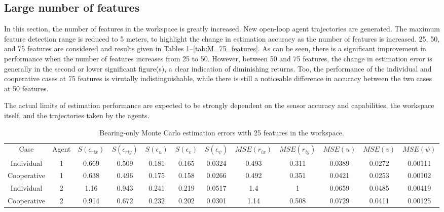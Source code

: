 \documentclass{aiaa-tc}
\begin{document}
\subsection{Large number of features}

In this section, the number of features in the workspace is greatly increased. New open-loop agent trajectories are generated. The maximum feature detection range is reduced to 5 meters, to highlight the change in estimation accuracy as the number of features is increased. 25, 50, and 75 features are considered and results given in Tables \ref{tab:M_25_features}--\ref{tab:M_75_features}. As can be seen, there is a significant improvement in performance when the number of features increases from 25 to 50. However, between 50 and 75 features, the change in estimation error is generally in the second or lower significant figure(s), a clear indication of diminishing returns. Too, the performance of the individual and cooperative cases at 75 features is virutally indistinguishable, while there is still a noticeable difference in accuracy between the two cases at 50 features.

The actual limits of estimation performance are expected to be strongly dependent on the sensor accuracy and capabilities, the workspace itself, and the trajectories taken by the agents. 

\begin{table}[b!]
\scriptsize
\centering
\begin{tabular}{c|c|c|c|c|c|c|c|c|c|c|c|}
Case & Agent & $S(\epsilon_{rix})$ & $S(\epsilon_{riy})$ & $S(\epsilon_{u})$ & $S(\epsilon_{v})$ & $S(\epsilon_{\psi})$ & $MSE(r_{ix})$ & $MSE(r_{iy})$ & $MSE(u)$ & $MSE(v)$ & $MSE(\psi)$ \\
Individual & 1& 0.669& 0.509& 0.181& 0.165& 0.0324& 0.493& 0.311& 0.0389& 0.0272& 0.00111 \\
Cooperative & 1& 0.638& 0.496& 0.175& 0.158& 0.0266& 0.492& 0.351& 0.0421& 0.0253& 0.00102 \\
Individual & 2& 1.16& 0.943& 0.241& 0.219& 0.0517& 1.4& 1& 0.0659& 0.0485& 0.00419 \\
Cooperative & 2& 0.914& 0.672& 0.232& 0.202& 0.0301& 1.14& 0.508& 0.0729& 0.0411& 0.00125
\end{tabular}
\caption{Bearing-only Monte Carlo estimation errors with 25 features in the workspace.}
\label{tab:M_25_features}
\end{table}
\end{document}
